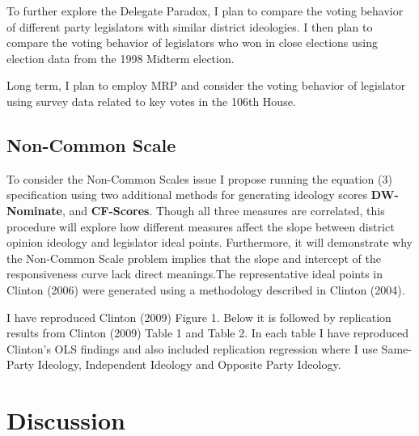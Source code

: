 \documentclass[10pt,letterpaper]{article}
\begin{document}
To further explore the Delegate Paradox, I plan to compare the voting behavior of different party legislators with similar district ideologies. I then plan to compare the voting behavior of legislators who won in close elections using election data from the 1998 Midterm election.

Long term, I plan to employ MRP and consider the voting behavior of legislator using survey data related to key votes in the 106th House.

\newpage




 

% 


\newpage


\subsection{Non-Common Scale}
To consider the Non-Common Scales issue I propose running the equation (3) specification using two additional methods for generating ideology scores \textbf{DW-Nominate}, and \textbf{CF-Scores}. Though all three measures are correlated, this procedure will explore how different measures affect the slope between district opinion ideology and legislator ideal points. Furthermore, it will demonstrate why the Non-Common Scale problem implies that the slope and intercept of the responsiveness curve lack direct meanings.The representative ideal points in Clinton (2006) were generated using a methodology described in Clinton (2004).


I have reproduced Clinton (2009) Figure 1. Below it is followed by replication results from Clinton (2009) Table 1 and Table 2. In each table I have reproduced Clinton's OLS findings and also included replication regression where I use Same-Party Ideology, Independent Ideology and Opposite Party Ideology.





\section{Discussion} 







\newpage
%
\end{document}
